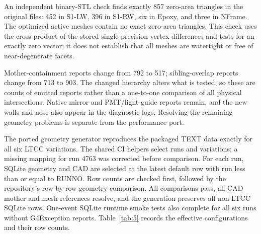 An independent binary-STL check finds exactly 857 zero-area triangles in the original files: 452 in S1-LW, 396
in S1-RW, six in Epoxy, and three in NFrame. The optimized active meshes contain no exact zero-area triangles.
This check uses the cross product of the stored single-precision vertex differences and tests for an exactly
zero vector; it does not establish that all meshes are watertight or free of near-degenerate facets.

Mother-containment reports change from 792 to 517; sibling-overlap reports change from 713 to 903. The changed
hierarchy alters what is tested, so these are counts of emitted reports rather than a one-to-one comparison of
all physical intersections. Native mirror and PMT/light-guide reports remain, and the new walls and nose also
appear in the diagnostic logs. Resolving the remaining geometry problems is separate from the performance port.

The ported geometry generator reproduces the packaged TEXT data exactly for all six LTCC variations. The shared
CI helpers select runs and variations; a missing mapping for run 4763 was corrected before comparison. For each
run, SQLite geometry and CAD are selected at the latest default row with run less than or equal to RUNNO. Row
counts are checked first, followed by the repository's row-by-row geometry comparison. All comparisons pass,
all CAD mother and mesh references resolve, and the generation preserves all non-LTCC SQLite rows. One-event
SQLite runtime smoke tests also complete for all six runs without G4Exception reports. Table~\ref{tab:5}
records the effective configurations and their row counts.

